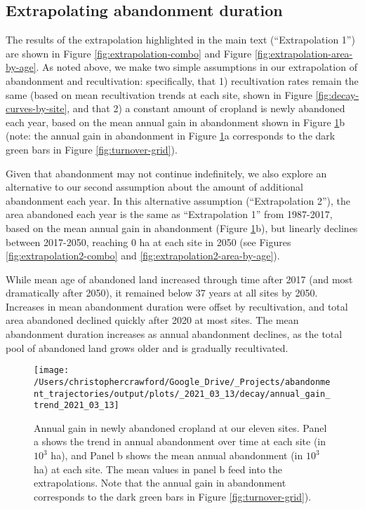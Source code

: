 \documentclass[9pt,twoside,lineno]{pnas-new}
\begin{document}
\newpage

\hypertarget{section-extrapolation-si}{%
\subsection{Extrapolating abandonment duration}\label{section-extrapolation-si}}

The results of the extrapolation highlighted in the main text (``Extrapolation 1'') are shown in Figure \ref{fig:extrapolation-combo} and Figure \ref{fig:extrapolation-area-by-age}.
As noted above, we make two simple assumptions in our extrapolation of abandonment and recultivation: specifically, that 1) recultivation rates remain the same (based on mean recultivation trends at each site, shown in Figure \ref{fig:decay-curves-by-site}, and that 2) a constant amount of cropland is newly abandoned each year, based on the mean annual gain in abandonment shown in Figure \ref{fig:annual-gain-trend}b (note: the annual gain in abandonment in Figure \ref{fig:annual-gain-trend}a corresponds to the dark green bars in Figure \ref{fig:turnover-grid}).

Given that abandonment may not continue indefinitely, we also explore an alternative to our second assumption about the amount of additional abandonment each year.
In this alternative assumption (``Extrapolation 2''), the area abandoned each year is the same as ``Extrapolation 1'' from 1987-2017, based on the mean annual gain in abandonment (Figure \ref{fig:annual-gain-trend}b), but linearly declines between 2017-2050, reaching 0 ha at each site in 2050 (see Figures \ref{fig:extrapolation2-combo} and \ref{fig:extrapolation2-area-by-age}).

While mean age of abandoned land increased through time after 2017 (and most dramatically after 2050), it remained below 37 years at all sites by 2050.
Increases in mean abandonment duration were offset by recultivation, and total area abandoned declined quickly after 2020 at most sites.
The mean abandonment duration increases as annual abandonment declines, as the total pool of abandoned land grows older and is gradually recultivated.



\begin{figure}
\texttt{[image: /Users/christophercrawford/Google\_Drive/\_Projects/abandonment\_trajectories/output/plots/\_2021\_03\_13/decay/annual\_gain\_trend\_2021\_03\_13]} \caption{Annual gain in newly abandoned cropland at our eleven sites. Panel a shows the trend in annual abandonment over time at each site (in \(10^3\) ha), and Panel b shows the mean annual abandonment (in \(10^3\) ha) at each site. The mean values in panel b feed into the extrapolations. Note that the annual gain in abandonment corresponds to the dark green bars in Figure \ref{fig:turnover-grid}).}\label{fig:annual-gain-trend}
\end{figure}
\end{document}
